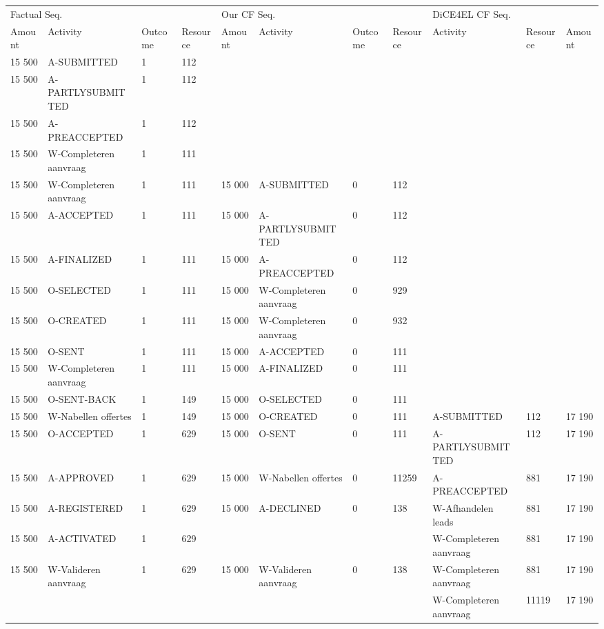 \begin{tabular}{lllllllllll}
\toprule
\multicolumn{4}{l}{Factual Seq.} & \multicolumn{4}{l}{Our CF Seq.} & \multicolumn{3}{l}{DiCE4EL CF Seq.} \\
Amount & Activity & Outcome & Resource & Amount & Activity & Outcome & Resource & Activity & Resource & Amount \\
\midrule
15 500 & A-SUBMITTED & 1 & 112 &  &  &  &  &  &  &  \\
15 500 & A-PARTLYSUBMITTED & 1 & 112 &  &  &  &  &  &  &  \\
15 500 & A-PREACCEPTED & 1 & 112 &  &  &  &  &  &  &  \\
15 500 & W-Completeren aanvraag & 1 & 111 &  &  &  &  &  &  &  \\
15 500 & W-Completeren aanvraag & 1 & 111 & 15 000 & A-SUBMITTED & 0 & 112 &  &  &  \\
15 500 & A-ACCEPTED & 1 & 111 & 15 000 & A-PARTLYSUBMITTED & 0 & 112 &  &  &  \\
15 500 & A-FINALIZED & 1 & 111 & 15 000 & A-PREACCEPTED & 0 & 112 &  &  &  \\
15 500 & O-SELECTED & 1 & 111 & 15 000 & W-Completeren aanvraag & 0 & 929 &  &  &  \\
15 500 & O-CREATED & 1 & 111 & 15 000 & W-Completeren aanvraag & 0 & 932 &  &  &  \\
15 500 & O-SENT & 1 & 111 & 15 000 & A-ACCEPTED & 0 & 111 &  &  &  \\
15 500 & W-Completeren aanvraag & 1 & 111 & 15 000 & A-FINALIZED & 0 & 111 &  &  &  \\
15 500 & O-SENT-BACK & 1 & 149 & 15 000 & O-SELECTED & 0 & 111 &  &  &  \\
15 500 & W-Nabellen offertes & 1 & 149 & 15 000 & O-CREATED & 0 & 111 & A-SUBMITTED & 112 & 17 190 \\
15 500 & O-ACCEPTED & 1 & 629 & 15 000 & O-SENT & 0 & 111 & A-PARTLYSUBMITTED & 112 & 17 190 \\
15 500 & A-APPROVED & 1 & 629 & 15 000 & W-Nabellen offertes & 0 & 11259 & A-PREACCEPTED & 881 & 17 190 \\
15 500 & A-REGISTERED & 1 & 629 & 15 000 & A-DECLINED & 0 & 138 & W-Afhandelen leads & 881 & 17 190 \\
15 500 & A-ACTIVATED & 1 & 629 &  &  &  &  & W-Completeren aanvraag & 881 & 17 190 \\
15 500 & W-Valideren aanvraag & 1 & 629 & 15 000 & W-Valideren aanvraag & 0 & 138 & W-Completeren aanvraag & 881 & 17 190 \\
 &  &  &  &  &  &  &  & W-Completeren aanvraag & 11119 & 17 190 \\
\bottomrule
\end{tabular}
